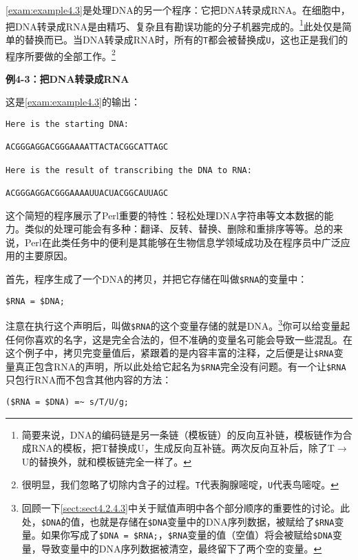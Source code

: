 \autoref{exam:example4.3}是处理DNA的另一个程序：它把DNA转录成RNA。在细胞中，把DNA转录成RNA是由精巧、复杂且有勘误功能的分子机器完成的。\footnote{简要来说，DNA的编码链是另一条链（模板链）的反向互补链，模板链作为合成RNA的模板，把T替换成U，生成反向互补链。两次反向互补后，除了T$\rightarrow$U的替换外，就和模板链完全一样了。}此处仅是简单的替换而已。当DNA转录成RNA时，所有的\verb|T|都会被替换成\verb|U|，这也正是我们的程序所要做的全部工作。\footnote{很明显，我们忽略了切除内含子的过程。\verb|T|代表胸腺嘧啶，\verb|U|代表鸟嘧啶。}

\textbf{例4-3：把DNA转录成RNA}



这是\autoref{exam:example4.3}的输出：

\begin{lstlisting}
Here is the starting DNA:

ACGGGAGGACGGGAAAATTACTACGGCATTAGC

Here is the result of transcribing the DNA to RNA:

ACGGGAGGACGGGAAAAUUACUACGGCAUUAGC
\end{lstlisting}

这个简短的程序展示了Perl重要的特性：轻松处理DNA字符串等文本数据的能力。类似的处理可能会有多种：翻译、反转、替换、删除和重排序等等。总的来说，Perl在此类任务中的便利是其能够在生物信息学领域成功及在程序员中广泛应用的主要原因。

首先，程序生成了一个DNA的拷贝，并把它存储在叫做\verb|$RNA|的变量中：

\begin{lstlisting}
$RNA = $DNA;
\end{lstlisting}

注意在执行这个声明后，叫做\verb|$RNA|的这个变量存储的就是DNA。\footnote{回顾一下\autoref{sect:sect4.2.4.3}中关于赋值声明中各个部分顺序的重要性的讨论。此处，\verb|$DNA|的值，也就是存储在\verb|$DNA|变量中的DNA序列数据，被赋给了\verb|$RNA|变量。如果你写成了\verb|$DNA = $RNA;|，\verb|$RNA|变量的值（空值）将会被赋给\verb|$DNA|变量，导致变量中的DNA序列数据被清空，最终留下了两个空的变量。}你可以给变量起任何你喜欢的名字，这是完全合法的，但不准确的变量名可能会导致一些混乱。在这个例子中，拷贝完变量值后，紧跟着的是内容丰富的注释，之后便是让\verb|$RNA|变量真正包含RNA的声明，所以此处给它起名为\verb|$RNA|完全没有问题。有一个让\verb|$RNA|只包行RNA而不包含其他内容的方法：

\begin{lstlisting}
($RNA = $DNA) =~ s/T/U/g;
\end{lstlisting}


